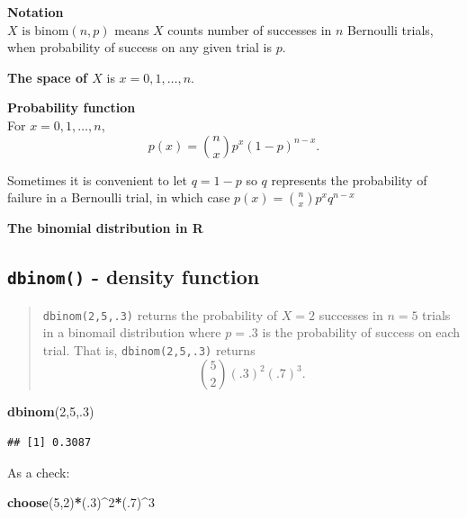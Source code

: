 \documentclass[
]{book}
\newenvironment{Shaded}{\begin{snugshade}}{\end{snugshade}}
\newcommand{\DecValTok}[1]{\textcolor[rgb]{0.00,0.00,0.81}{#1}}
\newcommand{\FunctionTok}[1]{\textcolor[rgb]{0.13,0.29,0.53}{\textbf{#1}}}
\newcommand{\NormalTok}[1]{#1}
\newcommand{\SpecialCharTok}[1]{\textcolor[rgb]{0.81,0.36,0.00}{\textbf{#1}}}
\theoremstyle{definition}
\theoremstyle{definition}
\theoremstyle{definition}
\theoremstyle{definition}
\theoremstyle{remark}
\begin{document}
\textbf{Notation}\\
\(X \text{ is binom}(n,p)\) means \(X\) counts number of successes in \(n\) Bernoulli trials, when probability of success on any given trial is \(p\).

\textbf{The space of \(X\)} is \(x = 0, 1, \ldots, n\).

\textbf{Probability function}\\
For \(x = 0, 1, \ldots, n\), \[p(x)=\binom{n}{x}p^x(1-p)^{n-x}.\]

Sometimes it is convenient to let \(q = 1-p\) so \(q\) represents the probability of failure in a Bernoulli trial, in which case \(p(x) = \binom{n}{x}p^xq^{n-x}\)

\textbf{The binomial distribution in R}

\subsection*{\texorpdfstring{\texttt{dbinom()} - density function}{dbinom() - density function}}\label{dbinom---density-function}

\begin{quote}
\texttt{dbinom(2,5,.3)} returns the probability of \(X=2\) successes in \(n=5\) trials in a binomail distribution where \(p = .3\) is the probability of success on each trial. That is, \texttt{dbinom(2,5,.3)} returns \[\binom{5}{2}(.3)^2(.7)^3.\]
\end{quote}

\begin{Shaded}
\begin{Highlighting}[]
\FunctionTok{dbinom}\NormalTok{(}\DecValTok{2}\NormalTok{,}\DecValTok{5}\NormalTok{,.}\DecValTok{3}\NormalTok{)}
\end{Highlighting}
\end{Shaded}

\begin{verbatim}
## [1] 0.3087
\end{verbatim}

As a check:

\begin{Shaded}
\begin{Highlighting}[]
\FunctionTok{choose}\NormalTok{(}\DecValTok{5}\NormalTok{,}\DecValTok{2}\NormalTok{)}\SpecialCharTok{*}\NormalTok{(.}\DecValTok{3}\NormalTok{)}\SpecialCharTok{\^{}}\DecValTok{2}\SpecialCharTok{*}\NormalTok{(.}\DecValTok{7}\NormalTok{)}\SpecialCharTok{\^{}}\DecValTok{3}
\end{Highlighting}
\end{Shaded}
\end{document}
